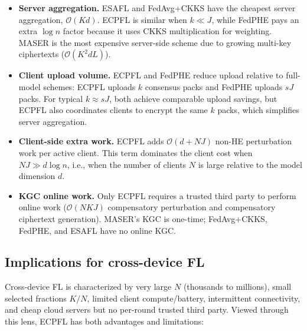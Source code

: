 \documentclass[a4paper,11pt]{article}
\begin{document}
\begin{itemize}
    \item \textbf{Server aggregation.} ESAFL and FedAvg+CKKS have the cheapest server aggregation, $\mathcal{O}(Kd)$. ECPFL is similar when $k\ll J$, while FedPHE pays an extra $\log n$ factor because it uses CKKS multiplication for weighting. MASER is the most expensive server-side scheme due to growing multi-key ciphertexts ($\mathcal{O}(K^2 dL)$).
    \item \textbf{Client upload volume.} ECPFL and FedPHE reduce upload relative to full-model schemes: ECPFL uploads $k$ consensus packs and FedPHE uploads $sJ$ packs. For typical $k\approx sJ$, both achieve comparable upload savings, but ECPFL also coordinates clients to encrypt the same $k$ packs, which simplifies server aggregation.
    \item \textbf{Client-side extra work.} ECPFL adds $\mathcal{O}(d+NJ)$ non-HE perturbation work per active client. This term dominates the client cost when $NJ \gg d\log n$, i.e., when the number of clients $N$ is large relative to the model dimension $d$.
    \item \textbf{KGC online work.} Only ECPFL requires a trusted third party to perform online work ($\mathcal{O}(NKJ)$ compensatory perturbation and compensatory ciphertext generation). MASER's KGC is one-time; FedAvg+CKKS, FedPHE, and ESAFL have no online KGC.
\end{itemize}

\subsection{Implications for cross-device FL}
\label{ssec:cross-device}

Cross-device FL is characterized by very large $N$ (thousands to millions), small selected fractions $K/N$, limited client compute/battery, intermittent connectivity, and cheap cloud servers but no per-round trusted third party. Viewed through this lens, ECPFL has both advantages and limitations:
\end{document}

